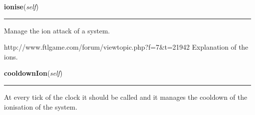     \vspace{0.5ex}

\hspace{.8\funcindent}\begin{boxedminipage}{\funcwidth}

    \raggedright \textbf{ionise}(\textit{self})

    \vspace{-1.5ex}

    \rule{\textwidth}{0.5\fboxrule}
\setlength{\parskip}{2ex}
    Manage the ion attack of a system.

    http://www.ftlgame.com/forum/viewtopic.php?f=7\&t=21942 Explanation of 
    the ions.

\setlength{\parskip}{1ex}
    \end{boxedminipage}

    \label{systems:System:cooldownIon}

    \vspace{0.5ex}

\hspace{.8\funcindent}\begin{boxedminipage}{\funcwidth}

    \raggedright \textbf{cooldownIon}(\textit{self})

    \vspace{-1.5ex}

    \rule{\textwidth}{0.5\fboxrule}
\setlength{\parskip}{2ex}
    At every tick of the clock it should be called and it manages the 
    cooldown of the ionisation of the system.

\setlength{\parskip}{1ex}
    \end{boxedminipage}

    \label{systems:System:reparation}

    \vspace{0.5ex}

